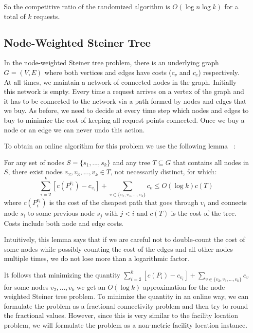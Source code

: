 So the competitive ratio of the randomized algorithm is $O(\log n \log k)$ for a total of $k$ requests.

\subsection{Node-Weighted Steiner Tree}

In the node-weighted Steiner tree problem, there is an underlying graph $G=(V,E)$ where both vertices and edges have costs ($c_v$ and $c_e$) respectively. At all times, we maintain a network of connected nodes in the graph. Initially this network is empty. Every time a request arrives on a vertex of the graph and it has to be connected to the network via a path formed by nodes and edges that we buy. As before, we need to decide at every time step which nodes and edges to buy to minimize the cost of keeping all request points connected. Once we buy a node or an edge we can never undo this action.

To obtain an online algorithm for this problem we use the following lemma ~\cite{naor11:node-weighted-steiner-tree}:

\begin{lemma}
For any set of nodes $S = \{s_1,...,s_k\}$ and any tree $T \subseteq G$ that contains all nodes in $S$, 
there exist nodes $v_2, v_3, ... , v_k \in T$, not necessarily distinct, for which:
\[ \sum_{i=2}^k [c(P^{v_i}_i) - c_{v_i}] + \sum_{v \in \{v_2, v_3, ... , v_k\}} c_{v} \le O(\log k) c(T) \]
where $c(P^{v_i}_i)$ is the cost of the cheapest path that goes through $v_i$ and connects node $s_i$ to some previous node $s_j$ with $j<i$ and $c(T)$ is the cost of the tree. Costs include both node and edge costs.
\end{lemma}

Intuitively, this lemma says that if we are careful not to double-count the cost of some nodes while possibly counting the cost of the edges and all other nodes multiple times, we do not lose more than a logarithmic factor.

It follows that minimizing the quantity $\sum_{i=2}^k [c(P_i) - c_{v_i}] + \sum_{v \in \{v_2, v_3, ... , v_k\}} c_{v}$ for some nodes $v_2,...,v_k$ we get an $O(\log k)$ approximation for the node weighted Steiner tree problem. To minimize the quantity in an online way, we can formulate the problem as a fractional connectivity problem and then try to round the fractional values. However, since this is very similar to the facility location problem, we will formulate the problem as a non-metric facility location instance.

